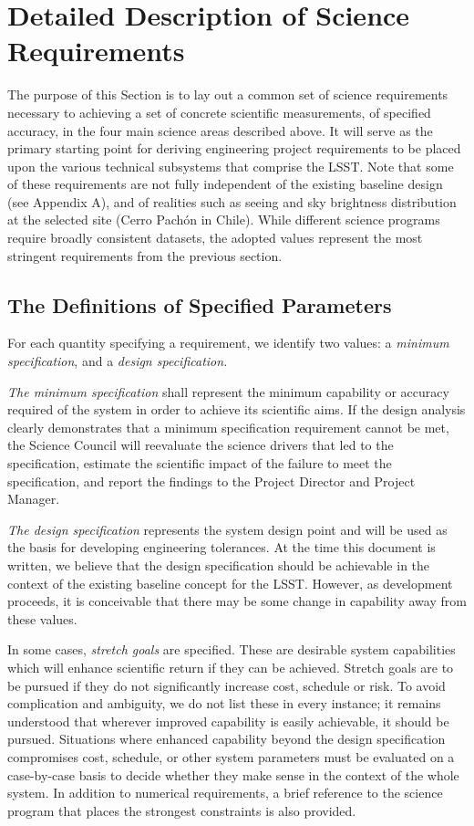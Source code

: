 \newpage
\section{Detailed Description of Science Requirements }

The purpose of this Section is to lay out a common set of science
requirements necessary to achieving a set of concrete scientific measurements,
of specified accuracy, in the four main science areas described above.  It
will serve as the primary starting point for deriving engineering project
requirements to be placed upon the various technical subsystems that
comprise the LSST. Note that some of these requirements are not fully
independent of the existing baseline design (see Appendix A), and of
realities such as seeing and sky brightness distribution at the selected
site (Cerro Pach\'{o}n in Chile). While different science programs
require broadly consistent datasets, the adopted values represent the
most stringent requirements from the previous section.


\subsection{The Definitions of Specified Parameters }

For each quantity specifying a requirement, we identify two values: a {\it
minimum specification}, and a {\it design specification.}

{\it The minimum specification} shall represent the minimum capability
or accuracy required of the system in order to achieve its scientific
aims. If the design analysis clearly demonstrates that a minimum
specification requirement cannot be met, the Science Council will
reevaluate the science drivers that led to the specification, estimate
the scientific impact of the failure to meet the specification, and
report the findings to the Project Director and Project Manager.

{\it The design specification} represents the system design point and will
be used as the basis for developing engineering tolerances.  At the time
this document is written, we believe that the design specification should
be achievable in the context of the existing baseline concept for the LSST.
However, as development proceeds, it is conceivable that there may be some
change in capability away from these values.

In some cases, {\it stretch goals} are specified. These are desirable
system capabilities which will enhance scientific return if they can be
achieved. Stretch goals are to be pursued if they do not significantly
increase cost, schedule or risk. To avoid complication and ambiguity, we do
not list these in every instance; it remains understood that wherever
improved capability is easily achievable, it should be pursued.  Situations
where enhanced capability beyond the design specification compromises cost,
schedule, or other system parameters must be evaluated on a case-by-case
basis to decide whether they make sense in the context of the whole system.
In addition to numerical requirements, a brief reference to the science
program that places the strongest constraints is also provided.


